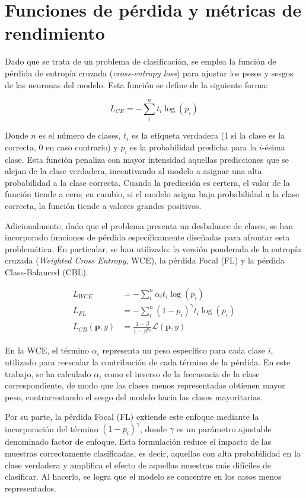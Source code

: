\section{Funciones de pérdida y métricas de rendimiento}
\label{section5:metrics}
Dado que se trata de un problema de clasificación, se emplea la función de pérdida de entropía cruzada (\textit{cross-entropy loss}) para ajustar los pesos y sesgos de las neuronas del modelo. Esta función se define de la siguiente forma:

\begin{equation}
L_{CE} = -\sum_i^n t_i \log(p_i)
\end{equation}

Donde $n$ es el número de clases, $t_i$ es la etiqueta verdadera (1 si la clase es la correcta, 0 en caso contrario) y $p_i$ es la probabilidad predicha para la $i$-ésima clase. Esta función penaliza con mayor intensidad aquellas predicciones que se alejan de la clase verdadera, incentivando al modelo a asignar una alta probabilidad a la clase correcta. Cuando la predicción es certera, el valor de la función tiende a cero; en cambio, si el modelo asigna baja probabilidad a la clase correcta, la función tiende a valores grandes positivos.

Adicionalmente, dado que el problema presenta un desbalance de clases, se han incorporado funciones de pérdida específicamente diseñadas para afrontar esta problemática. En particular, se han utilizado: la versión ponderada de la entropía cruzada (\textit{Weighted Cross Entropy}, WCE), la pérdida Focal (FL) y la pérdida Class-Balanced (CBL).

\begin{align}
    L_{WCE} &= -\sum_i^n \alpha_{i} t_i \log(p_i) \\
    L_{FL} &= -\sum_i^n (1-p_i)^{\gamma} t_i \log(p_i) \\
    L_{CB}(\textbf{p},y) &= \frac{1-\beta}{1-\beta^{n_{y}}} \mathcal{L}(\textbf{p},y)
\end{align}

En la WCE, el término $\alpha_i$ representa un peso específico para cada clase $i$, utilizado para reescalar la contribución de cada término de la pérdida. En este trabajo, se ha calculado $\alpha_i$ como el inverso de la frecuencia de la clase correspondiente, de modo que las clases menos representadas obtienen mayor peso, contrarrestando el sesgo del modelo hacia las clases mayoritarias.

Por su parte, la pérdida Focal (FL) \cite{lin_focal_2020} extiende este enfoque mediante la incorporación del término $(1 - p_i)^\gamma$, donde $\gamma$ es un parámetro ajustable denominado factor de enfoque. Esta formulación reduce el impacto de las muestras correctamente clasificadas, es decir, aquellas con alta probabilidad en la clase verdadera y amplifica el efecto de aquellas muestras más difíciles de clasificar. Al hacerlo, se logra que el modelo se concentre en los casos menos representados.

